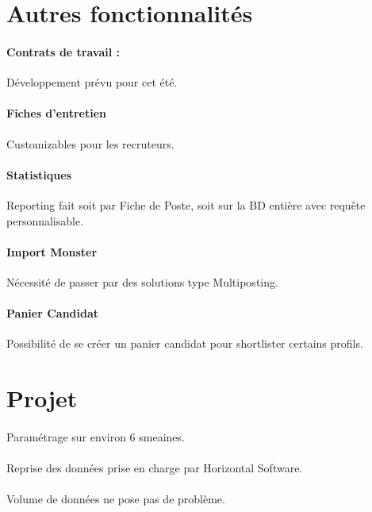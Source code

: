 \section{Autres fonctionnalités} 
\paragraph{Contrats de travail :} Développement prévu pour cet été.
\paragraph{Fiches d'entretien}  Customizables pour les recruteurs.
\paragraph{Statistiques} Reporting fait soit par Fiche de Poste, soit sur la BD entière avec requête personnalisable.
\paragraph{Import Monster} Nécessité de passer par des solutions type Multiposting.
\paragraph{Panier Candidat} Possibilité de se créer un panier candidat pour shortlister certains profils.

\section{Projet}
\paragraph{} Paramétrage sur environ 6 smeaines.
\paragraph{} Reprise des données prise en charge par Horizontal Software.
\paragraph{} Volume de données ne pose pas de problème.
